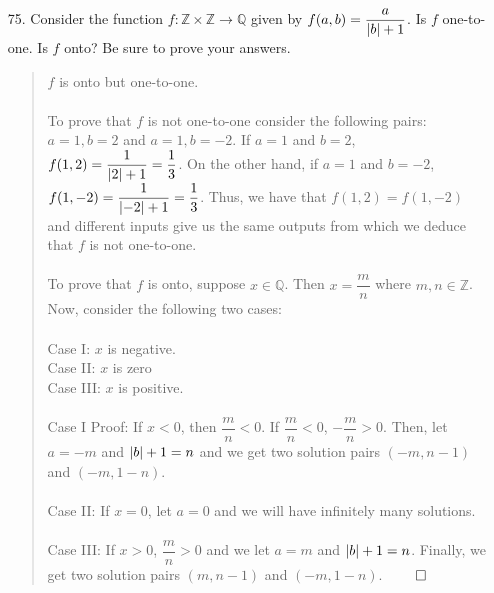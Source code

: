 \documentclass[12pt, a4paper]{article}
\newcommand{\ints}{\mathbb{Z}}
\newcommand{\rats}{\mathbb{Q}}
\newcommand\und[1]{\underline{\smash{#1}}}
\DeclarePairedDelimiter\abs{\lvert}{\rvert}
\begin{document}
\begin{itemize}
\item[75.]
Consider the function $f : \ints \times \ints \rightarrow \rats$ given by $f(a, b) = \dfrac{a}{\abs{b} + 1}$.
Is $f$ one-to-one. Is $f$ onto? Be sure to prove your answers.
\begin{quote}
$f$ is onto but \und{NOT} one-to-one.\\\\
To prove that $f$ is not one-to-one consider the following pairs: $a = 1, b = 2$ and $a = 1, b = -2$.
If $a = 1$ and $b = 2$, $f(1, 2) = \dfrac{1}{\abs{2} + 1} = \dfrac{1}{3}$. On the other hand, if $a = 1$ and $b = -2$,
$f(1, -2) = \dfrac{1}{\abs{-2} + 1} = \dfrac{1}{3}$. Thus, we have that $f(1, 2) = f(1, -2)$ and different inputs
give us the same outputs from which we deduce that $f$ is not one-to-one.
\\\\
To prove that $f$ is onto, suppose $x \in \rats$. Then $x = \dfrac{m}{n}$ where $m, n \in \ints$.
Now, consider the following two cases:\\\\
Case I: $x$ is negative.\\
Case II: $x$ is zero\\
Case III: $x$ is positive.\\\\
Case I Proof: If $x < 0$, then $\dfrac{m}{n} < 0$. If $\dfrac{m}{n} < 0$, $-\dfrac{m}{n} > 0$.
Then, let $a = -m$ and $\abs{b} + 1 = n$ and we get two solution pairs $(-m, n - 1)$ and $(-m, 1 - n)$.
\\\\
Case II: If $x = 0$, let $a = 0$ and we will have infinitely many solutions.
\\\\
Case III: If $x > 0$, $\dfrac{m}{n} > 0$ and we let $a = m$ and $\abs{b} + 1 = n$. Finally,
we get two solution pairs $(m, n - 1)$ and $(-m, 1 - n)$.
$\qed$
\end{quote}

\item[]
\item[]


\end{itemize}
\end{document}
